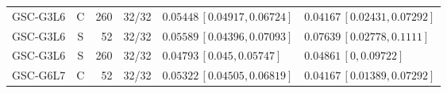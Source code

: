 \begin{longtable}{lcrcp{44mm}p{44mm}}
GSC-G3L6 & C & 260 & 32/32 & \(0.05448\,[0.04917,0.06724]\) & \(0.04167\,[0.02431,0.07292]\)\\
GSC-G3L6 & S & 52 & 32/32 & \(0.05589\,[0.04396,0.07093]\) & \(0.07639\,[0.02778,0.1111]\)\\
GSC-G3L6 & S & 260 & 32/32 & \(0.04793\,[0.045,0.05747]\) & \(0.04861\,[0,0.09722]\)\\
GSC-G6L7 & C & 52 & 32/32 & \(0.05322\,[0.04505,0.06819]\) & \(0.04167\,[0.01389,0.07292]\)\\

\end{longtable}
